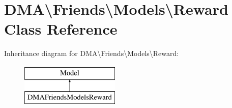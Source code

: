 \hypertarget{classDMA_1_1Friends_1_1Models_1_1Reward}{\section{D\+M\+A\textbackslash{}Friends\textbackslash{}Models\textbackslash{}Reward Class Reference}
\label{classDMA_1_1Friends_1_1Models_1_1Reward}
}
Inheritance diagram for D\+M\+A\textbackslash{}Friends\textbackslash{}Models\textbackslash{}Reward\+:\begin{figure}[H]
\begin{center}
\leavevmode
\includegraphics[height=2.000000cm]{d7/dc4/classDMA_1_1Friends_1_1Models_1_1Reward}
\end{center}
\end{figure}
